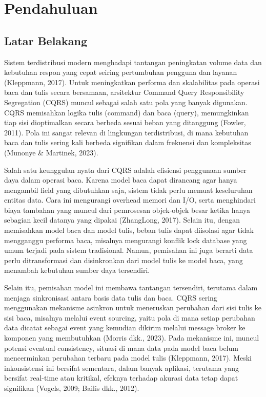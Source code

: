 \chapter{Pendahuluan}

\section{Latar Belakang}

Sistem terdistribusi modern menghadapi tantangan peningkatan volume data dan kebutuhan respon yang cepat seiring pertumbuhan pengguna dan layanan (Kleppmann, 2017).
Untuk meningkatkan performa dan skalabilitas pada operasi baca dan tulis secara bersamaan, arsitektur Command Query Responsibility Segregation (CQRS) muncul sebagai salah satu pola yang banyak digunakan.
CQRS memisahkan logika tulis (command) dan baca (query), memungkinkan tiap sisi dioptimalkan secara berbeda sesuai beban yang ditanggung (Fowler, 2011).
Pola ini sangat relevan di lingkungan terdistribusi, di mana kebutuhan baca dan tulis sering kali berbeda signifikan dalam frekuensi dan kompleksitas (Munonye \& Martinek, 2023).

Salah satu keunggulan nyata dari CQRS adalah efisiensi penggunaan sumber daya dalam operasi baca.
Karena model baca dapat dirancang agar hanya mengambil field yang dibutuhkan saja, sistem tidak perlu memuat keseluruhan entitas data.
Cara ini mengurangi overhead memori dan I/O, serta menghindari biaya tambahan yang muncul dari pemrosesan objek-objek besar ketika hanya sebagian kecil datanya yang dipakai (ZhangLong, 2017).
Selain itu, dengan memisahkan model baca dan model tulis, beban tulis dapat diisolasi agar tidak mengganggu performa baca, misalnya mengurangi konflik lock database yang umum terjadi pada sistem tradisional.
Namun, pemisahan ini juga berarti data perlu ditransformasi dan disinkronkan dari model tulis ke model baca, yang menambah kebutuhan sumber daya tersendiri.

Selain itu, pemisahan model ini membawa tantangan tersendiri, terutama dalam menjaga sinkronisasi antara basis data tulis dan baca.
CQRS sering menggunakan mekanisme asinkron untuk meneruskan perubahan dari sisi tulis ke sisi baca, misalnya melalui event sourcing, yaitu pola di mana setiap perubahan data dicatat sebagai event yang kemudian dikirim melalui message broker ke komponen yang membutuhkan (Morris dkk., 2023).
Pada mekanisme ini, muncul potensi eventual consistency, situasi di mana data pada model baca belum mencerminkan perubahan terbaru pada model tulis (Kleppmann, 2017).
Meski inkonsistensi ini bersifat sementara, dalam banyak aplikasi, terutama yang bersifat real-time atau kritikal, efeknya terhadap akurasi data tetap dapat signifikan (Vogels, 2009; Bailis dkk., 2012).

